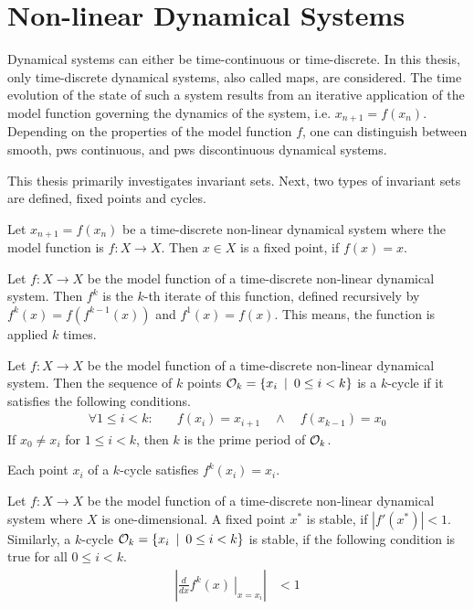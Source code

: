 \section{Non-linear Dynamical Systems}

Dynamical systems can either be time-continuous or time-discrete.
In this thesis, only time-discrete dynamical systems, also called maps, are considered.
The time evolution of the state of such a system results from an iterative application of the model function governing the dynamics of the system, i.e. $x_{n+1} = f(x_n)$.
Depending on the properties of the model function $f$, one can distinguish between smooth, \gls{pws} continuous, and \gls{pws} discontinuous dynamical systems.

This thesis primarily investigates invariant sets.
Next, two types of invariant sets are defined, fixed points and cycles.

\begin{definition}
	Let $x_{n+1} = f(x_n)$ be a time-discrete non-linear dynamical system where the model function is $f: X \to X$.
	Then $x \in X$ is a fixed point, if $f(x) = x$.
\end{definition}

\begin{definition}
	Let $f: X \to X$ be the model function of a time-discrete non-linear dynamical system.
	Then $f^k$ is the $k$-th iterate of this function, defined recursively by $f^k(x) = f\left(f^{k-1}(x)\right)$ and $f^1(x) = f(x)$.
	This means, the function is applied $k$ times.
\end{definition}

\begin{definition}[Cycle]
	Let $f: X \to X$ be the model function of a time-discrete non-linear dynamical system.
	Then the sequence of $k$ points $\mathcal{O}_k = \{x_i \:\mid\: 0 \leq i < k\}$ is a $k$-cycle if it satisfies the following conditions.
	\begin{align}
		\forall 1 \leq i < k: \quad & f(x_i) = x_{i+1} \quad \land \quad f(x_{k-1}) = x_0
	\end{align}
	If $x_0 \neq x_i$ for $1 \leq i < k$, then $k$ is the prime period of $\mathcal{O}_k$.
\end{definition}

Each point $x_i$ of a $k$-cycle satisfies $f^k(x_i) = x_i$.

\begin{definition}[Stability]
	Let $f: X \to X$ be the model function of a time-discrete non-linear dynamical system where $X$ is one-dimensional.
	A fixed point $x^*$ is stable, if $|f'(x^*)| < 1$.
	Similarly, a $k$-cycle $\mathcal{O}_k = \{x_i \:\mid\: 0 \leq i < k\}$ is stable, if the following condition is true for all $0 \leq i < k$.
	\begin{align}
		\left| \left. \frac{d}{dx}f^k(x) \:\right|_{x = x_i}\right| & < 1
	\end{align}
\end{definition}

